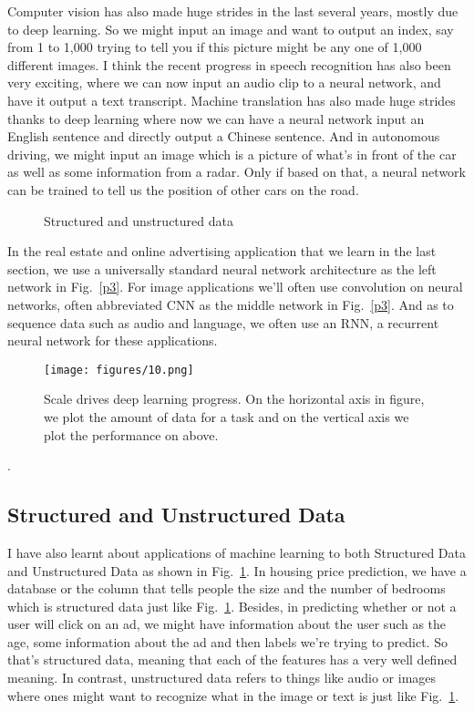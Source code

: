 \documentclass[a4paper]{article}
\begin{document}
Computer vision has also made huge strides in the last several years, mostly due to deep learning. So we might input an image and want to output an index, say from 1 to 1,000 trying to tell you if this picture might be any one of 1,000 different images. I think the recent progress in speech recognition has also been very exciting, where we can now input an audio clip to a neural network, and have it output a text transcript. Machine translation has also made huge strides thanks to deep learning where now we can have a neural network input an English sentence and directly output a Chinese sentence. And in autonomous driving, we might input an image which is a picture of what's in front of the car as well as some information from a radar. Only if based on that, a neural network can be trained to tell us the position of other cars on the road.
\begin{figure} 
	\centering 
	\caption{Structured and unstructured data} 
	\label{p4} 
\end{figure}

In the real estate and online advertising application that we learn in the last section, we use a universally standard neural network architecture as the left network in Fig.~\ref{p3}. For image applications we'll often use convolution on neural networks, often abbreviated CNN as the middle network in Fig.~\ref{p3}. And as to sequence data such as audio and language, we often use an RNN, a recurrent neural network for these applications.
\begin{figure}
	\begin{center}
		\texttt{[image: figures/10.png]}
	\end{center}
	\caption{Scale drives deep learning progress. On the horizontal axis in figure, we plot the amount of data for a task and on the vertical axis we plot the performance on above.}
	\label{p5}
\end{figure}.

\subsection{Structured and Unstructured Data}
I have also learnt about applications of machine learning to both Structured Data and Unstructured Data as shown in Fig.~\ref{p4}. In housing price prediction, we have a database or the column that tells people the size and the number of bedrooms which is structured data just like Fig.~\ref{p4}. Besides, in predicting whether or not a user will click on an ad, we might have information about the user such as the age, some information about the ad and then labels we're trying to predict. So that's structured data, meaning that each of the features has a very well defined meaning. In contrast, unstructured data refers to things like audio or images where ones might want to recognize what in the image or text is just like Fig.~\ref{p4}.
\end{document}
